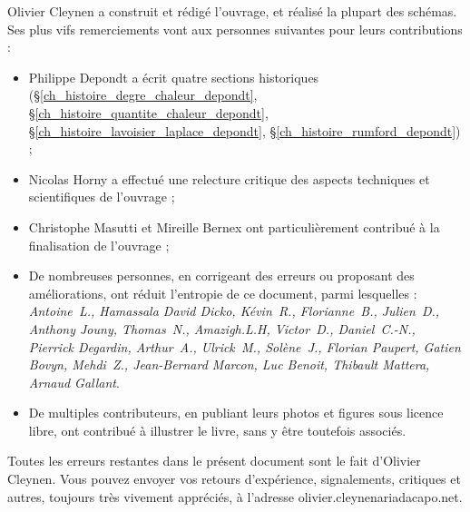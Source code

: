 Olivier Cleynen a construit et rédigé l’ouvrage, et réalisé la plupart des schémas. Ses plus vifs remerciements vont aux personnes suivantes pour leurs contributions :
\begin{itemize}
	\item Philippe Depondt a écrit quatre sections historiques (\S\ref{ch_histoire_degre_chaleur_depondt}, \S\ref{ch_histoire_quantite_chaleur_depondt}, \S\ref{ch_histoire_lavoisier_laplace_depondt}, \S\ref{ch_histoire_rumford_depondt}) ;
	\item Nicolas Horny a effectué une relecture critique des aspects techniques et scientifiques de l’ouvrage ;
	\item Christophe Masutti et Mireille Bernex ont particulièrement contribué à la finalisation de l’ouvrage ;
	\item De nombreuses personnes, en corrigeant des erreurs ou proposant des améliorations, ont réduit l’entropie de ce document, parmi lesquelles : {\small\textit{Antoine\ L., Hamassala David Dicko, Kévin\ R., Florianne\ B., Julien\ D., Anthony Jouny, Thomas\ N., Amazigh.L.H, Victor\ D., Daniel\ C.-N., Pierrick Degardin, Arthur\ A., Ulrick\ M., Solène\ J., Florian Paupert, Gatien Bovyn, Mehdi\ Z., Jean-Bernard Marcon, Luc Benoit, Thibault Mattera, Arnaud Gallant}}.
	\item De multiples contributeurs, en publiant leurs photos et figures sous licence libre, ont contribué à illustrer le livre, sans y être toutefois associés.
\end{itemize}

Toutes les erreurs restantes dans le présent document sont le fait d’Olivier \mbox{Cleynen}. Vous pouvez envoyer vos retours d’expérience, signalements, critiques et autres, toujours très vivement appréciés, à l’adresse olivier.cleynenariadacapo.net.

